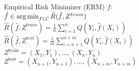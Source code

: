 Empirical Risk Minimizer (ERM) $\hat{f}$:\\
$\hat{f} \in \operatorname*{arg\,min}_{f \in \mathcal{C}} \hat{R}(\hat{f}, Z^{train})$\\
$\hat{R}(\hat{f}, Z^{train}) = \frac{1}{n} \sum_{i=1}^n Q(Y_i, \hat{f}(X_i))$\\
$\hat{R}(\hat{f}, Z^{test}) = \frac{1}{m} \sum_{i=n+1}^{n+m} Q(Y_i, \hat{f}(X_i))$\\
$Z^\text{train}={(X_1,Y_1),...,(X_n,Y_n)}$ \\
$Z^\text{test}={(X_{n+1},Y_{n+1}),...,(X_{n+m},Y_{n+m})}$



